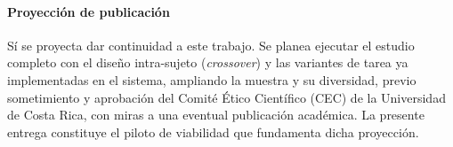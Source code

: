 \documentclass[conference]{IEEEtran}
\begin{document}
\paragraph{Proyecci\'on de publicaci\'on}
S\'i se proyecta dar continuidad a este trabajo. Se planea ejecutar el estudio completo con el
dise\~no intra-sujeto (\emph{crossover}) y las variantes de tarea ya implementadas en el sistema,
ampliando la muestra y su diversidad, previo sometimiento y aprobaci\'on del Comit\'e \'Etico
Cient\'ifico (CEC) de la Universidad de Costa Rica, con miras a una eventual publicaci\'on
acad\'emica. La presente entrega constituye el piloto de viabilidad que fundamenta dicha
proyecci\'on.



\end{document}
